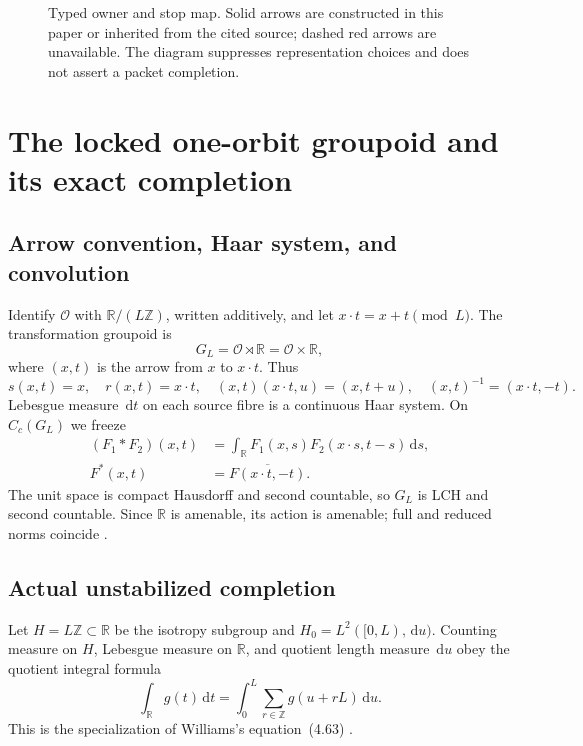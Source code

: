 \documentclass[11pt]{article}
\theoremstyle{definition}
\newcommand{\R}{\mathbb{R}}
\newcommand{\Z}{\mathbb{Z}}
\newcommand{\dd}{\,\mathrm{d}}
\begin{document}
\begin{figure}[htbp]
\centering

\caption{Typed owner and stop map.  Solid arrows are constructed in this paper or inherited from the cited source; dashed red arrows are unavailable.  The diagram suppresses representation choices and does not assert a packet completion.}\label{fig:owner}
\end{figure}

\section{The locked one-orbit groupoid and its exact completion}

\subsection{Arrow convention, Haar system, and convolution}

Identify \(\mathcal O\) with \(\R/(L\Z)\), written additively, and let \(x\cdot t=x+t\pmod L\).  The transformation groupoid is
\[
 G_L=\mathcal O\rtimes\R=\mathcal O\times\R,
\]
where \((x,t)\) is the arrow from \(x\) to \(x\cdot t\).  Thus
\[
 s(x,t)=x,\quad r(x,t)=x\cdot t,\quad
 (x,t)(x\cdot t,u)=(x,t+u),\quad
 (x,t)^{-1}=(x\cdot t,-t).
\]
Lebesgue measure \(\dd t\) on each source fibre is a continuous Haar system.  On \(C_c(G_L)\) we freeze
\begin{align}
 (F_1*F_2)(x,t)&=\int_{\R} F_1(x,s)F_2(x\cdot s,t-s)\dd s,\label{eq:conv}\\
 F^{*}(x,t)&=\overline{F(x\cdot t,-t)}.\label{eq:star}
\end{align}
The unit space is compact Hausdorff and second countable, so \(G_L\) is LCH and second countable.  Since \(\R\) is amenable, its action is amenable; full and reduced norms coincide \cite[Examples~2.7(2) and Theorem~5.3]{AnantharamanDelaroche2002}.

\subsection{Actual unstabilized completion}

Let \(H=L\Z\subset\R\) be the isotropy subgroup and \(H_0=L^2([0,L),\dd u)\).  Counting measure on \(H\), Lebesgue measure on \(\R\), and quotient length measure \(\dd u\) obey the quotient integral formula
\[
 \int_{\R} g(t)\dd t
 =\int_0^L\sum_{r\in\Z}g(u+rL)\dd u.
\]
This is the specialization of Williams's equation~(4.63) \cite[p.~138]{Williams2007}.
\end{document}
